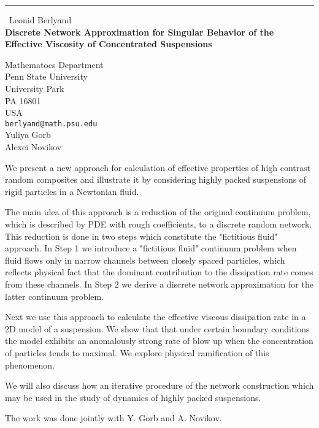 \documentclass{report}
\begin{document}
\begin{center}
\rule{6in}{1pt} \
{\large Leonid Berlyand \\
{\bf  Discrete Network Approximation for Singular Behavior of the Effective Viscosity of Concentrated Suspensions}}

Mathematocs Department \\ Penn State University \\ University Park \\ PA 16801 \\ USA
\\
{\tt berlyand@math.psu.edu}\\
Yuliya Gorb\\
 Alexei Novikov\end{center}

We present a new approach for calculation of effective properties of high
contrast random composites
and illustrate it by considering highly packed suspensions of rigid
particles in a Newtonian fluid.

The main idea of this approach is a reduction of the original continuum
problem, which is described by PDE with rough coefficients, to a discrete
random network. This reduction is done in two steps which constitute the
"fictitious fluid" approach. In Step 1 we introduce a "fictitious fluid"
continuum
problem when fluid flows only in narrow channels between closely spaced
particles, which reflects physical fact that the dominant contribution to
the dissipation rate comes from these channels. In Step 2 we derive a
discrete network approximation for the latter continuum problem.

Next we use this approach to calculate the effective viscous dissipation
rate in a 2D model of a suspension. We show that that under certain
boundary conditions the model exhibits an anomalously strong rate of blow
up when the concentration of particles tends to maximal. We explore
physical ramification of this phenomenon.


We will also discuss how an iterative procedure of the network
construction which may be used in the study of dynamics of highly packed
suspensions.

The work was done jointly with Y. Gorb and A. Novikov.
\end{document}
